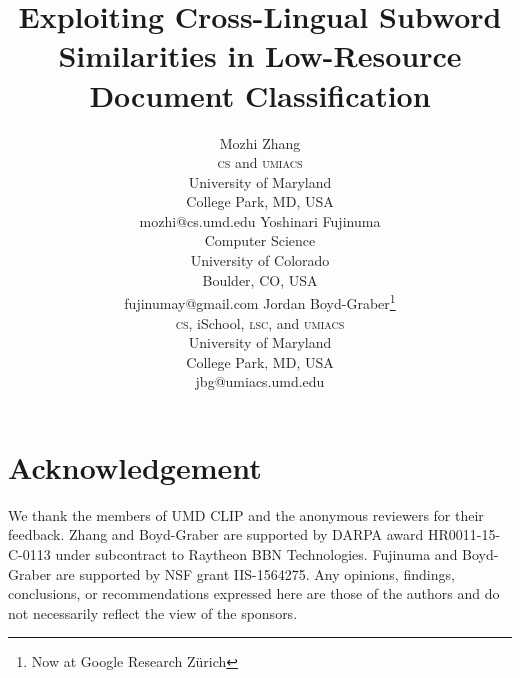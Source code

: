 \documentclass[letterpaper]{article}
\title{Exploiting Cross-Lingual Subword Similarities in Low-Resource Document
Classification}
\author{Mozhi Zhang \\
  \textsc{cs} and \textsc{umiacs} \\
  University of Maryland \\
  College Park, MD, USA \\
  mozhi@cs.umd.edu
  \And
  Yoshinari Fujinuma \\
  Computer Science \\
  University of Colorado \\
  Boulder, CO, USA \\
  fujinumay@gmail.com
  \And
  Jordan Boyd-Graber\thanks{Now at Google Research Z\"urich} \\
  \textsc{cs}, iSchool, \textsc{lsc}, and \textsc{umiacs}\\
  University of Maryland \\
  College Park, MD, USA \\
  jbg@umiacs.umd.edu \\}
\newcommand{\latexfile}[1]{}
\begin{document}
\maketitle

\latexfile{00-abstract}
\latexfile{10-intro}
\latexfile{20-model}
\latexfile{30-experiments}
\latexfile{40-related}
\latexfile{50-conclusion}

\section*{Acknowledgement}
We thank the members of UMD CLIP and the anonymous reviewers for their
feedback.
Zhang and Boyd-Graber are supported by DARPA award HR0011-15-C-0113 under
subcontract to Raytheon BBN Technologies.
Fujinuma and Boyd-Graber are supported by NSF grant IIS-1564275.
Any opinions, findings, conclusions, or recommendations expressed here are
those of the authors and do not necessarily reflect the view of the sponsors.

\fontsize{9.0pt}{10.0pt} \selectfont


\end{document}
